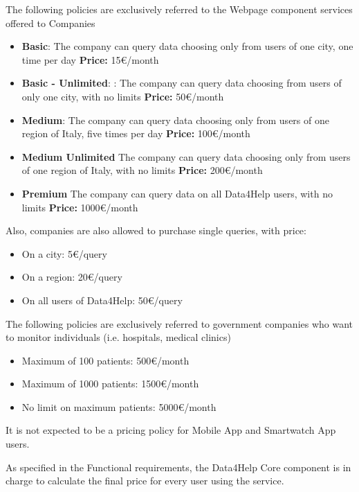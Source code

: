 The following policies are exclusively referred to the Webpage component services offered to Companies

\begin{itemize}
    \item \textbf{Basic}: The company can query data choosing only from users of one city, one time per day
     \textbf{Price:} 15\euro/month
    \item	\textbf{Basic - Unlimited}: : The company can query data choosing from users of only one city, with no limits
\textbf{Price:} 50\euro/month
    \item \textbf{Medium}: The company can query data choosing only from users of one region of Italy, five times per day
\textbf{Price:} 100\euro/month
    \item \textbf{Medium Unlimited} The company can query data choosing only from users of one region of Italy, with no limits
\textbf{Price:} 200\euro/month
    \item \textbf{Premium} The company can query data on all Data4Help users, with no limits
\textbf{Price:} 1000\euro/month
\end{itemize}

\noindent Also, companies are also allowed to purchase single queries, with price:

\begin{itemize}
    \item On a city: 5\euro/query
    \item On a region: 20\euro/query
    \item On all users of Data4Help: 50\euro/query
\end{itemize}

\noindent The following policies are exclusively referred to government companies who want to monitor individuals (i.e. hospitals, medical clinics) 

\begin{itemize}
    \item Maximum of 100 patients:
500\euro/month
    \item Maximum of 1000 patients: 
1500\euro/month
    \item No limit on maximum patients:
5000\euro/month
\end{itemize}




\noindent It is not expected to be a pricing policy for Mobile App and Smartwatch App users.

\noindent As specified in the Functional requirements, the Data4Help Core component is in charge to calculate the final price for every user using the service.








